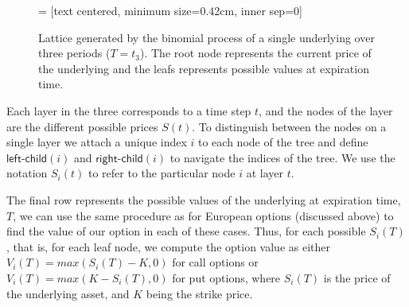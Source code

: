 \begin{figure}
  \centering
   = [text centered, minimum size=0.42cm, inner sep=0]


\vspace{2mm}

\caption{Lattice generated by the binomial process of a single
  underlying over three periods ($T=t_3$). The root
  node represents the current price of the underlying and the leafs
  represents possible values at expiration time.}
\label{fig:binomial-tree}
\end{figure}

Each layer in the three corresponds to a time step $t$, and the nodes
of the layer are the different possible prices $S(t)$. To distinguish
between the nodes on a single layer we attach a unique index $i$ to
each node of the tree and define $\mathsf{left\textsf{-}child}(i)$ and
$\mathsf{right\textsf{-}child}(i)$ to navigate the indices of the
tree. We use the notation $S_i(t)$ to refer to the particular node $i$
at layer $t$.

The final row represents the possible values of the underlying at
expiration time, $T$, we can use the same procedure as for European
options (discussed above) to find the value of our option in each of
these cases. Thus, for each possible $S_i(T)$, that is, for each leaf
node, we compute the option value as either $V_i(T) = max(S_i(T)-K, 0)$
for call options or $V_i(T) = max(K-S_i(T),0)$ for put options, where
$S_i(T)$ is the price of the underlying asset, and $K$ being the strike
price.

